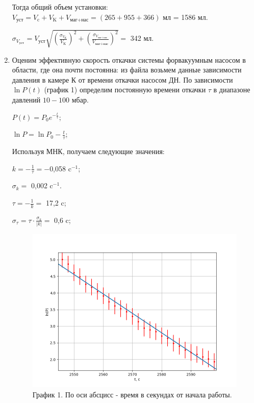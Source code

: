 \documentclass[a4paper,12pt]{article} %
\begin{document}
\begin{enumerate}
	\begin{center}
	\end{center}
	
	Тогда общий объем установки: $V_{\text{уст}} = V_{\text{c}} + V_{\text{K}} + V_{\text{маг+нас}} = (265 + 955 + 366)$ мл = 1586 мл.
	
	$\sigma_{V_{\text{уст}}} = V_{\text{уст}}\sqrt{\left(\frac{\sigma_{V_{\text{K}}}}{V_{\text{K}}}\right)^2 + \left(\frac{\sigma_{V_{\text{маг+нас}}}}{V_{\text{маг+нас}}}\right)^2} = $ 342 мл.
	
	\begin{center}
	\end{center}
	
	\item Оценим эффективную скорость откачки системы форвакуумным насосом в области, где она почти постоянна: из файла возьмем данные зависимости давления в камере К от времени откачки насосом ДН. По зависимости $\ln{P}(t)$ (график 1) определим постоянную времени откачки $\tau$ в диапазоне давлений $10-100$ мбар.
	
	$P(t) = P_{0}e^{-\frac{t}{\tau}}$;
	
	$\ln{P} = \ln{P_{0}} - \frac{t}{\tau}$;
	
	Используя МНК, получаем следующие значения:
	
	$k = -\frac{1}{\tau} = -$0,058 c$^{-1}$;
	
	$\sigma_{k} = $ 0,002 c$^{-1}$.
	
	\vspace{5mm}
	$\tau = -\frac{1}{k} = $ 17,2 c;
	
	$\sigma_{\tau} = \tau \cdot \frac{\sigma_{k}}{|k|} = $ 0,6 c;

	\begin{center}
	\end{center}

	\begin{figure}[h!]
		\centering
		\includegraphics[scale=0.7]{lnP(t) ДН.png}
		\caption*{График 1. По оси абсцисс - время в секундах от начала работы.}
	\end{figure}
	


\end{enumerate}
\end{document}
